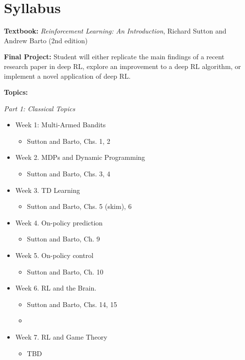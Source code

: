 \documentclass{article}
\begin{document}
\section{Syllabus}
{\bf Textbook:} {\it Reinforcement Learning: An Introduction}, Richard Sutton and Andrew Barto (2nd edition)

{\bf Final Project:} Student will either replicate the main findings of a recent research paper in deep RL, explore an improvement to a deep RL algorithm, or implement a novel application of deep RL. 

{\bf Topics:}

{\it Part 1: Classical Topics}
\begin{itemize}
    \item[] Week 1: Multi-Armed Bandits
        \begin{itemize}
            \item Sutton and Barto, Chs. 1, 2
        \end{itemize}
    \item[] Week 2. MDPs and Dynamic Programming
        \begin{itemize}
            \item Sutton and Barto, Chs. 3, 4
        \end{itemize}
    \item[] Week 3. TD Learning
        \begin{itemize}
            \item Sutton and Barto, Chs. 5 (skim), 6
        \end{itemize}
    \item[] Week 4. On-policy prediction 
        \begin{itemize}
            \item Sutton and Barto, Ch. 9
        \end{itemize}
    \item[] Week 5. On-policy control
        \begin{itemize}
            \item Sutton and Barto, Ch. 10
        \end{itemize} 
    \item[] Week 6. RL and the Brain. 
        \begin{itemize}
            \item Sutton and Barto, Chs. 14, 15
            \item \cite{niv}
        \end{itemize}
    \item[] Week 7. RL and Game Theory
        \begin{itemize}
            \item TBD
        \end{itemize}
         
\end{itemize}
\end{document}
